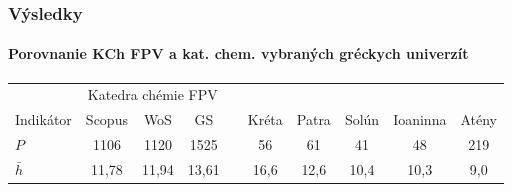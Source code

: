 \documentclass{beamer}
\begin{document}
\begin{frame}
  \frametitle{Výsledky}
  \framesubtitle{Porovnanie KCh FPV a kat. chem. vybraných gréckych univerzít}

  \begin{table}
    \centering\small
    \begin{tabularx}{\textwidth}{Xccclccccc}
    \toprule\noalign{\vspace{.5ex}}
               & \multicolumn{3}{c}{Katedra chémie FPV}& \phantom{M} & \multicolumn{5}{c}{\citet{Lazaridis2010}} \\
    Indikátor  & Scopus & WoS   & GS                 &  & Kréta & Patra & Solún & Ioaninna & Atény \\[0.3ex]
    \midrule\noalign{\vspace{.5ex}}
     $P$         & 1106   & 1120  & 1525               & & 56    & 61    & 41    & 48       & 219   \\
     $\bar{h}$  & 11,78  & 11,94 & 13,61              & & 16,6  & 12,6  & 10,4  & 10,3     & 9,0   \\[0.5ex]
      \bottomrule
    \end{tabularx}
  \end{table}
\end{frame}
\end{document}
